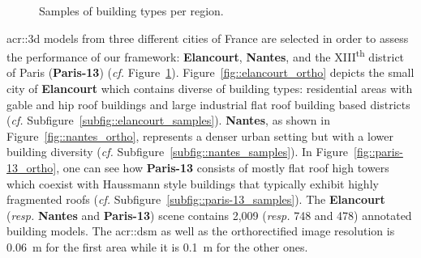 \begin{figure}[htpb]
{\begin{subfloatrow}[3]
{                    }
                \end{subfloatrow}
            }{
                \caption{
                    \label{fig::france_map}
                    Samples of building types per region.
                }
            }
        \end{figure}
        
        \gls{acr::3d} models from three different cities of France are selected in order to assess the performance of our framework: \textbf{Elancourt}, \textbf{Nantes}, and the XIII\textsuperscript{th} district of Paris (\textbf{Paris-13}) (\textit{cf.} Figure~\ref{fig::france_map}).
        Figure~\ref{fig::elancourt_ortho} depicts the small city of \textbf{Elancourt} which contains diverse of building types: residential areas with gable and hip roof buildings and large industrial flat roof building based districts (\textit{cf.} Subfigure~\ref{subfig::elancourt_samples}).
        \textbf{Nantes}, as shown in Figure~\ref{fig::nantes_ortho}, represents a denser urban setting but with a lower building diversity (\textit{cf.} Subfigure~\ref{subfig::nantes_samples}).
        In Figure~\ref{fig::paris-13_ortho}, one can see how \textbf{Paris-13} consists of mostly flat roof high towers which coexist with Haussmann style buildings that typically exhibit highly fragmented roofs (\textit{cf.} Subfigure~\ref{subfig::paris-13_samples}).
        The \textbf{Elancourt} (\textit{resp.} \textbf{Nantes} and \textbf{Paris-13}) scene contains 2,009 (\textit{resp.} 748 and 478) annotated building models.
        The \gls{acr::dsm} as well as the orthorectified image resolution is \SI{0.06}{\m} for the first area while it is \SI{0.1}{\m} for the other ones.\\

